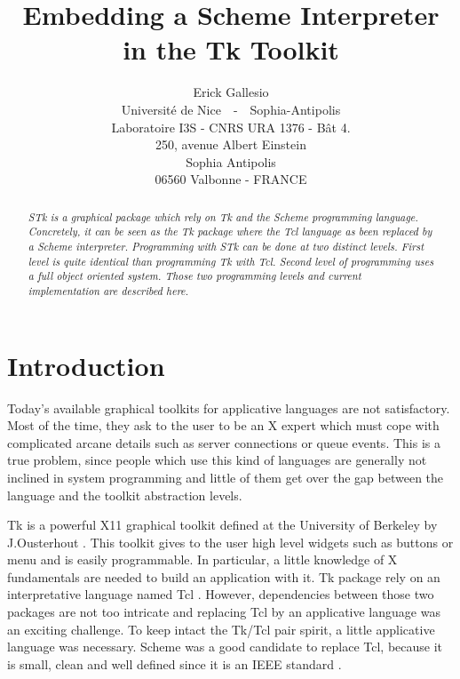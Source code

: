 %
%






%
% 

\newcommand{\stk}{{\sc STk }}
\title{Embedding a Scheme Interpreter in the Tk Toolkit}
{\footnotesize
\author{
Erick Gallesio \\
Universit\'e de Nice~~-~~Sophia-Antipolis \\
Laboratoire I3S - CNRS URA 1376 - B\^at 4. \\
250, avenue Albert Einstein \\
Sophia Antipolis \\
06560 Valbonne - FRANCE}}
\date{}
\maketitle
\vskip1cm
\begin{abstract}
{\it \stk is a graphical package which rely on Tk and the Scheme programming
language. Concretely, it can be seen as the Tk package where the
Tcl language as been {\em replaced} by a Scheme interpreter.  Programming with
{\stk} can be done at two distinct levels. First level is quite identical than
programming Tk with Tcl. Second level of programming uses a full object
oriented system. Those two programming levels and current implementation are
described here.}
\end{abstract}


\section{Introduction}
Today's available graphical toolkits for applicative languages are not
satisfactory. Most of the time, they ask to the user to be an X expert which
must cope with complicated arcane details such as server connections or queue
events.  This is a true problem, since people which use this kind of languages
are generally not inclined in system programming and little of them get over
the gap between the language and the toolkit abstraction levels.

Tk is a powerful X11 graphical tool\-kit de\-fi\-ned at the University of Berkeley
by J.Ousterhout \cite{Ouster-Tk}. This toolkit gives to the user high level
widgets such as buttons or menu and is easily programmable. In particular, a
little knowledge of X fundamentals are needed to build an application with it.
Tk package rely on an interpretative language named Tcl \cite{Ouster-Tcl}.
However, dependencies between those two packages are not too intricate and
replacing Tcl by an applicative language was an exciting challenge. To keep
intact the Tk/Tcl pair spirit, a little applicative language was necessary.
Scheme \cite{SICP} was a good candidate to replace Tcl, because it is small,
clean and well defined since it is an IEEE standard
\cite{IEEE-Scheme}. 

